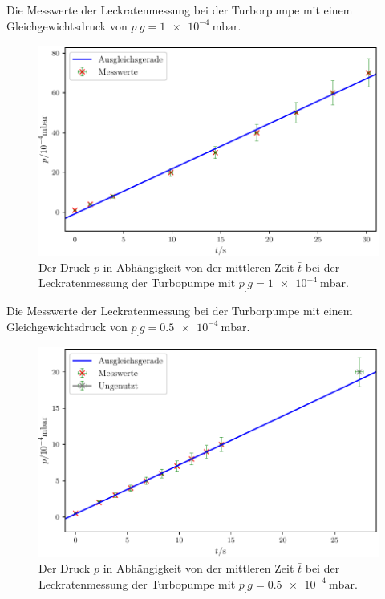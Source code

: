 \newpage
\begin{table}
\centering
\caption{Die Messwerte der Leckratenmessung bei der Turborpumpe mit einem Gleichgewichtsdruck von $p_.g = \SI{1e-4}{\milli\bar}$.}

\label{tab:TL3}
\end{table}

\begin{figure}
\centering
\includegraphics[width=\linewidth-70pt,height=\textheight-70pt,keepaspectratio]{content/images/TL3.pdf}
\caption{Der Druck $p$ in Abhängigkeit von der mittleren Zeit $\bar{t}$ bei der Leckratenmessung der Turbopumpe  mit $p_.g = \SI{1e-4}{\milli\bar}$.}
\label{fig:TL3}
\end{figure}

\begin{table}
\centering
\caption{Die Messwerte der Leckratenmessung bei der Turborpumpe mit einem Gleichgewichtsdruck von $p_.g = \SI{0.5e-4}{\milli\bar}$.}

\label{tab:TL4}
\end{table}

\begin{figure}
\centering
\includegraphics[width=\linewidth-70pt,height=\textheight-70pt,keepaspectratio]{content/images/TL4.pdf}
\caption{Der Druck $p$ in Abhängigkeit von der mittleren Zeit $\bar{t}$ bei der Leckratenmessung der Turbopumpe  mit $p_.g = \SI{0.5e-4}{\milli\bar}$.}
\label{fig:TL4}
\end{figure}


